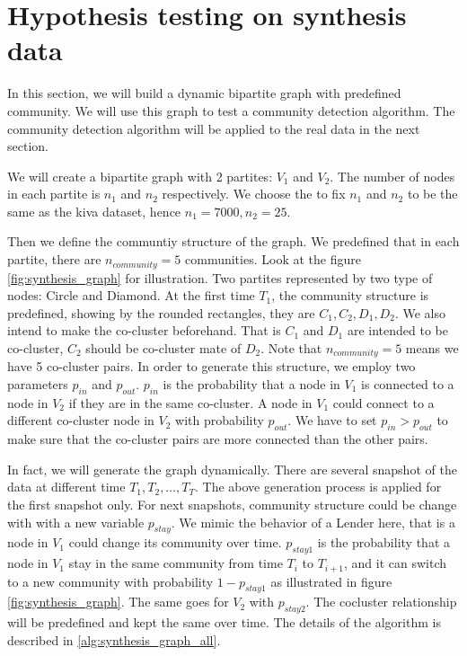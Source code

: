 

\section{Hypothesis testing on synthesis data}

In this section, we will build a dynamic bipartite graph with predefined community.
We will use this graph to test a community detection algorithm.
The community detection algorithm will be applied to the real data in the next section.

We will create a bipartite graph with 2 partites: $V_1$ and $V_2$.
The number of nodes in each partite is $n_1$ and $n_2$ respectively.
We choose the to fix $n_1$ and $n_2$ to be the same as the kiva dataset,
hence $n_1=7000, n_2=25$.

Then we define the communtiy structure of the graph.
We predefined that in each partite, there are $n_{community} = 5$ communities.
Look at the figure \ref{fig:synthesis_graph} for illustration.
Two partites represented by two type of nodes: Circle and Diamond.
At the first time $T_1$, the community structure is predefined, showing by the rounded rectangles, they are $C_1, C_2, D_1, D_2$.
We also intend to make the co-cluster beforehand.
That is $C_1$ and $D_1$ are intended to be co-cluster, $C_2$ should be co-cluster mate of $D_2$.
Note that $n_{community} = 5$ means we have 5 co-cluster pairs.
In order to generate this structure, we employ two parameters $p_{in}$ and $p_{out}$.
$p_{in}$ is the probability that a node in $V_1$ is connected to a node in $V_2$ if they are in the same co-cluster.
A node in $V_1$ could connect to a different co-cluster node in $V_2$ with probability $p_{out}$.
We have to set $p_{in} > p_{out}$ to make sure that the co-cluster pairs are more connected than the other pairs.

In fact, we will generate the graph dynamically.
There are several snapshot of the data at different time $T_1, T_2, \ldots, T_T$.
The above generation process is applied for the first snapshot only.
For next snapshots, community structure could be change with with a new variable $p_{stay}$.
We mimic the behavior of a Lender here, that is a node in $V_1$ could change its community over time.
$p_{stay1}$ is the probability that a node in $V_1$ stay in the same community from time $T_i$ to $T_{i+1}$,
and it can switch to a new community with probability $1-p_{stay1}$ as illustrated in figure \ref{fig:synthesis_graph}.
The same goes for $V_2$ with $p_{stay2}$.
The cocluster relationship will be predefined and kept the same over time.
The details of the algorithm is described in \ref{alg:synthesis_graph_all}.

